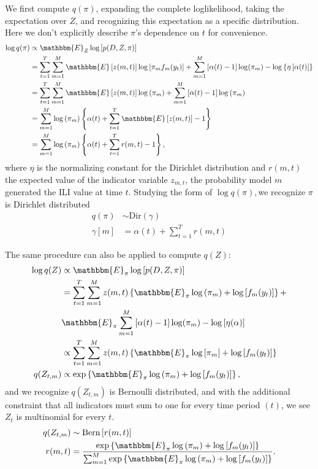 \documentclass[sagev,times,Review,10pt]{sagej}
\def\l{\left}
\def\r{\right}
\begin{document}
\begin{appendix}
We first compute $q(\pi)$, expanding the complete loglikelihood, taking the expectation over $Z$, and recognizing this expectation as a specific distribution.
Here we don't explicitly describe $\pi$'s dependence on $t$ for convenience.
\begin{align*}
  \log q(\pi) &\propto \mathbbm{E}_{Z} \log \l[ p(D,Z,\pi)\r]\\
              &= \sum_{t=1}^{T} \sum_{m=1}^{M}  \mathbbm{E} \l[z(m,t)\r] \log \l[ \pi_m f_{m}(y_{t}) \r] + \sum_{m=1}^{M} \l[\alpha(t)-1\r] \log(\pi_{m}) - \log \l\{\eta\l[\alpha(t)\r]\r\}\\
              &= \sum_{t=1}^{T} \sum_{m=1}^{M}  \mathbbm{E} \l[z(m,t)\r] \log \l( \pi_m \r) + \sum_{m=1}^{M} \l[\alpha(t)-1\r] \log\l(\pi_m\r)\\
              &= \sum_{m=1}^{M} \log \l( \pi_m \r)  \l\{ \alpha(t) + \sum_{t=1}^{T}  \mathbbm{E} \l[z(m,t)\r] - 1 \r\}\\
              &= \sum_{m=1}^{M} \log \l( \pi_m \r)  \l\{ \alpha(t) + \sum_{t=1}^{T}  r(m,t) - 1 \r\},
\end{align*}
where $\eta$ is the normalizing constant for the Dirichlet distribution and $r(m,t)$ the expected value of the indicator variable $z_{m,t}$, the probability model $m$ generated the ILI value at time $t$.
Studying the form of $\log q(\pi), $we recognize $\pi$ is Dirichlet distributed
\begin{align*}
  q(\pi) &\sim \mathrm{Dir}\l( \gamma \r)\\
  \gamma\l[m\r] &= \alpha(t) + \sum_{t=1}^{T}  r(m,t)
\end{align*}

The same procedure can also be applied to compute $q(Z)$:
\begin{align}
  \log q(Z) &\propto \mathbbm{E}_{\pi} \log \l[ p(D,Z,\pi)\r] \nonumber \\
            &=  \sum_{t=1}^{T} \sum_{m=1}^{M}  z(m,t) \l\{\mathbbm{E}_{\pi} \log \l( \pi_m \r) + \log \l[ f_{m}(y_{t}) \r]\r\} +  \nonumber\\
  & \mathbbm{E}_{\pi}\sum_{m=1}^{M} \l[\alpha(t)-1\r] \log(\pi_{m})  - \log\l[\eta(\alpha)\r] \nonumber \\
            & \propto \sum_{t=1}^{T} \sum_{m=1}^{M}  z(m,t) \l\{ \mathbbm{E}_{\pi} \log \l[ \pi_m \r] + \log \l[ f_{m}(y_{t}) \r] \r\} \nonumber \\
  q(Z_{t,m}) &\propto  \exp \l \{ \mathbbm{E}_{\pi} \log \l( \pi_m \r) + \log \l[ f_{m}(y_{t}) \r] \r \}  \label{notNorm},
\end{align}
and we recognize $q(Z_{t,m})$ is Bernoulli distributed, and with the additional constraint that all indicators must sum to one for every time period $(t)$, we see $Z_{t}$ is multinomial for every $t$. 
\begin{align}
  q(Z_{t,m}) &\sim \mathrm{Bern}\l[ r(m,t) \r]\\
  r(m,t) &= \dfrac{ \exp \l \{ \mathbbm{E}_{\pi} \log \l( \pi_m \r) + \log \l[ f_{m}(y_{t}) \r] \r \} } {\sum_{m=1}^{M} \exp \l \{ \mathbbm{E}_{\pi} \log \l( \pi_m \r) + \log \l[ f_{m}(y_{t}) \r] \r \}}.
\end{align}


\end{appendix}
\end{document}
